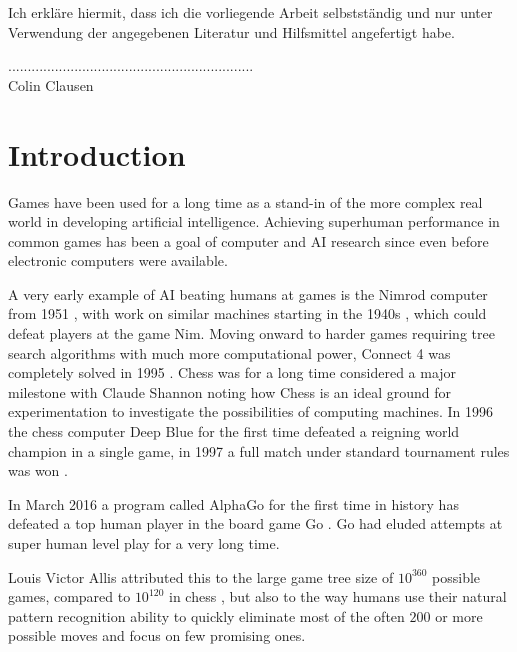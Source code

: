 \documentclass[12pt,onecolumn,oneside,titlepage]{article}
\begin{document}
\noindent Ich erkläre hiermit, dass ich die vorliegende Arbeit selbstständig und nur unter Verwendung der angegebenen Literatur und Hilfsmittel angefertigt habe.

\vspace{2cm}
\noindent ............................................................... \\
Colin Clausen

\thispagestyle{empty}

\pagebreak

\newpage\null\thispagestyle{empty}\newpage


\tableofcontents

\pagebreak



\section{Introduction}

Games have been used for a long time as a stand-in of the more complex real world in developing artificial intelligence. Achieving superhuman performance in common games has been a goal of computer and AI research since even before electronic computers were available.

A very early example of AI beating humans at games is the Nimrod computer from 1951 \cite{nimrod}, with work on similar machines starting in the 1940s \cite{nimmath}, which could defeat players at the game Nim.
Moving onward to harder games requiring tree search algorithms with much more computational power, Connect 4 was completely solved in 1995 \cite{trompsolved}.
Chess was for a long time considered a major milestone with Claude Shannon \cite{shannon1950xxii} noting how Chess is an ideal ground for experimentation to investigate the possibilities of computing machines.
In 1996 the chess computer Deep Blue for the first time defeated a reigning world champion in a single game, in 1997 a full match under standard tournament rules was won \cite{campbell2002deep}.

In March 2016 a program called AlphaGo for the first time in history has defeated a top human player in the board game Go \cite{leesedolVsAlphaGo}.
Go had eluded attempts at super human level play for a very long time.

Louis Victor Allis attributed \cite{allis1994searching} this to the large game tree size of $10^{360}$ possible games, compared to $10^{120}$ in chess \cite{shannon1950xxii},
but also to the way humans use their natural pattern recognition ability to quickly eliminate most of the often $200$ or more possible moves and focus on few promising ones.
\end{document}
